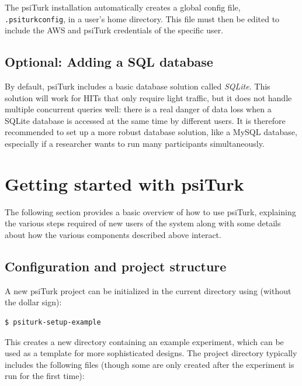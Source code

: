\documentclass[twocolumn]{svjour3}          %
\newcommand{\psiturk}[0]{\textsf{psiTurk}}
\begin{document}
The \psiturk{} installation automatically creates a global config file, \texttt{.psiturkconfig}, in a user's home directory. 
This file must then be edited to include the AWS and \psiturk{} credentials of the specific user. 

\subsection{Optional: Adding a SQL database}
By default, \psiturk{} includes a basic database solution called \emph{SQLite}. This solution
will work for HITs that only require light traffic, but it does not handle
multiple concurrent queries well: there is a real danger of data loss when a SQLite database is accessed at the same time by different users. 
It is therefore recommended to set up a more robust database solution, like a
MySQL database, especially if a researcher wants to run many participants simultaneously.

\section{Getting started with \psiturk{}}

The following section provides a basic overview of how to use \psiturk{},
explaining the various steps required of new users of the system along with
some details about how the various components described above interact.

\subsection{Configuration and project structure}

A new \psiturk{} project can be initialized in the current directory using (without the dollar sign):

\begin{lstlisting}
$ psiturk-setup-example
\end{lstlisting}

\noindent This creates a new directory containing an example experiment,
which can be used as a template for more sophisticated designs.
The project directory typically includes the following files (though some are only
created after the experiment is run for the first time):
\end{document}
